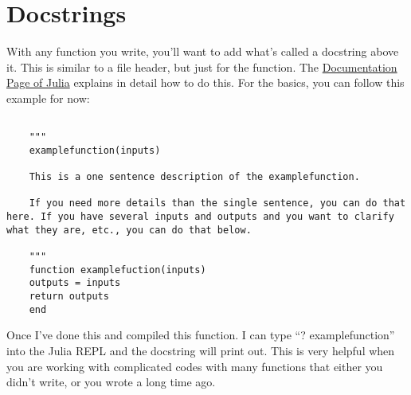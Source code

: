 \documentclass{article}%
\begin{document}
	
	\section*{Docstrings}
	
	With any function you write, you'll want to add what's called a docstring above it. This is similar to a file header, but just for the function.  The \href{https://docs.julialang.org/en/v1/manual/documentation/index.html#Accessing-Documentation-1}{Documentation Page of Julia} explains in detail how to do this. For the basics, you can follow this example for now:
	
	\begin{lstlisting}[frame=single]
	
	"""
	examplefunction(inputs)
	
	This is a one sentence description of the examplefunction.
	
	If you need more details than the single sentence, you can do that here. If you have several inputs and outputs and you want to clarify what they are, etc., you can do that below.
	
	"""
	function examplefuction(inputs)
	outputs = inputs
	return outputs
	end
	\end{lstlisting}
	
	Once I've done this and compiled this function. I can type ``? examplefunction'' into the Julia REPL and the docstring will print out. This is very helpful when you are working with complicated codes with many functions that either you didn't write, or you wrote a long time ago.
	
\end{document}
